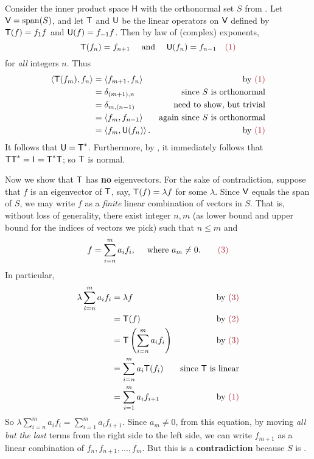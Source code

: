 \begin{example} \label{example 6.4.3}
Consider the inner product space \(\textsf{H}\) with the orthonormal set \(S\) from .
Let \(\textsf{V} = \operatorname{span}(S)\), and let \(\textsf{T}\) and \(\textsf{U}\) be the linear operators on \(\textsf{V}\) defined by \(\textsf{T}(f) = f_1 f\) and \(\textsf{U}(f) = f_{-1} f\).
Then by law of (complex) exponents,
\[
  \T(f_n)= f_{n + 1} \quad \text{ and } \quad \U(f_n) = f_{n-1} \quad \MAROON{(1)}
\]
for \emph{all} integers \(n\).
Thus
\begin{align*}
    \LG \T(f_m), f_n \RG & = \LG f_{m + 1}, f_n \RG & \text{by \MAROON{(1)}} \\
        & = \delta_{(m + 1), n} & \text{since \(S\) is orthonormal} \\
        & = \delta_{m, (n -1)} & \text{need to show, but trivial} \\
        & = \LG f_m, f_{n - 1} \RG & \text{again since \(S\) is orthonormal} \\
        & = \LG f_m, \U(f_n) \RG. & \text{by \MAROON{(1)}}
\end{align*}
It follows that \(\textsf{U} = \textsf{T}^*\).
Furthermore, by , it immediately follows that \(\textsf{T}\textsf{T}^* = \textsf{I}_{_{}} = \textsf{T}^*\textsf{T}\); so \(\textsf{T}\) is normal.

Now we show that \(\textsf{T}\) has \textbf{no} eigenvectors.
For the sake of contradiction, suppose that \(f\) is an eigenvector of \(\textsf{T}\), say, \(\textsf{T}(f) = \lambda f\) for some \(\lambda\). 
Since \(\textsf{V}\) equals the span of \(S\), we may write \(f\) as a \emph{finite} linear combination of vectors in \(S\).
That is, without loss of generality, there exist integer \(n, m\) (as lower bound and upper bound for the indices of vectors we pick) such that \(n \le m\) and
\[
    f = \sum_{i = n}^m a_i f_i, \quad \text{ where } a_m \ne 0. \quad \quad \MAROON{(3)}
\]
In particular,
\begin{align*}
    \lambda \sum_{i = n}^m a_i f_i & = \lambda f & \text{by \MAROON{(3)}} \\
        & = \T(f) & \text{by \MAROON{(2)}} \\
        & = \T \left( \sum_{i = n}^m a_i f_i \right) & \text{by \MAROON{(3)}} \\
        & = \sum_{i = n}^m a_i \T(f_i) & \text{since \(\T\) is linear} \\
        & = \sum_{i = 1}^m a_i f_{i + 1} & \text{by \MAROON{(1)}}
\end{align*}
So \(\lambda \sum_{i = n}^m a_i f_i = \sum_{i = 1}^m a_i f_{i + 1}\).
Since \(a_m \ne 0\), from this equation, by moving \emph{all but the last} terms from the right side to the left side, we can write \(f_{m + 1}\) as a linear combination of \(f_n, f_{n + 1}, ..., f_m\).
But this is a \textbf{contradiction} because \(S\) is \LID{}.
\end{example}

